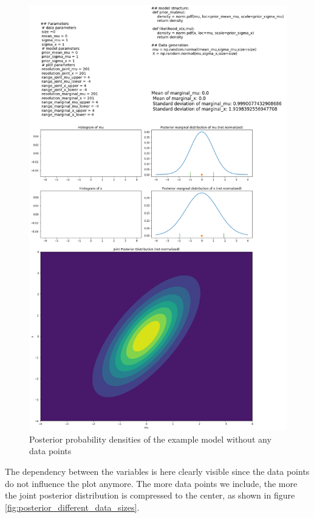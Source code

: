 \documentclass{article}
\begin{document}
\begin{figure}
	\includegraphics[width=\textwidth]{images/ground_truth_posterior_5.png}
	\caption[Posterior probability densities of the example model without any data points]{Posterior probability densities of the example model without any data points}
	\label{fig:ground_truth_posterior_5}
\end{figure}
The dependency between the variables is here clearly visible since the data points do not influence the plot anymore. The more data points we include, the more the joint posterior distribution is compressed to the center, as shown in figure \ref{fig:posterior_different_data_sizes}.
\end{document}
